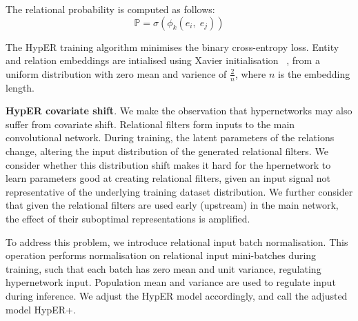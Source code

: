 \noindent The relational probability is computed as follows: 
\begin{equation}
	\mathbb{P} = \sigma(\phi_k(e_i, \; e_j)) 
\end{equation}

\noindent The HypER training algorithm minimises the binary cross-entropy loss. Entity and relation embeddings are intialised using Xavier initialisation \unskip ~\citep{glorot2010understanding}, from a uniform distribution with zero mean and varience of $ \frac{2}{n} $, where $ n $ is the embedding length. \par

\noindent \textbf{HypER covariate shift}. We make the observation that hypernetworks may also suffer from covariate shift. Relational filters form inputs to the main convolutional network. During training, the latent parameters of the relations change, altering the input distribution of the generated relational filters. We consider whether this distribution shift makes it hard for the hpernetwork to learn parameters good at creating relational filters, given an input signal not representative of the underlying training dataset distribution. We further consider that given the relational filters are used early (upstream) in the main network, the effect of their suboptimal representations is amplified. \par

\noindent To address this problem, we introduce relational input batch normalisation. This operation performs normalisation on relational input mini-batches during training, such that each batch has zero mean and unit variance, regulating hypernetwork input. Population mean and variance are used to regulate input during inference. We adjust the HypER model accordingly, and call the adjusted model HypER+. \par

\bigskip

